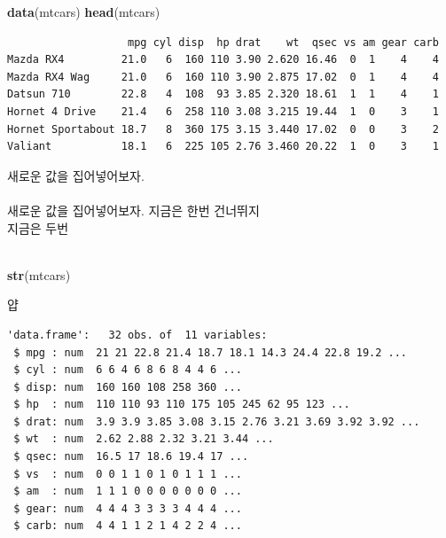 \documentclass[]{article}
\newenvironment{Shaded}{\begin{snugshade}}{\end{snugshade}}
\newcommand{\KeywordTok}[1]{\textcolor[rgb]{0.13,0.29,0.53}{\textbf{#1}}}
\newcommand{\StringTok}[1]{\textcolor[rgb]{0.31,0.60,0.02}{#1}}
\newcommand{\OperatorTok}[1]{\textcolor[rgb]{0.81,0.36,0.00}{\textbf{#1}}}
\newcommand{\NormalTok}[1]{#1}
\begin{document}
\begin{Shaded}
\begin{Highlighting}[]
\KeywordTok{data}\NormalTok{(mtcars)}
\KeywordTok{head}\NormalTok{(mtcars)}
\end{Highlighting}
\end{Shaded}

\begin{verbatim}
                   mpg cyl disp  hp drat    wt  qsec vs am gear carb
Mazda RX4         21.0   6  160 110 3.90 2.620 16.46  0  1    4    4
Mazda RX4 Wag     21.0   6  160 110 3.90 2.875 17.02  0  1    4    4
Datsun 710        22.8   4  108  93 3.85 2.320 18.61  1  1    4    1
Hornet 4 Drive    21.4   6  258 110 3.08 3.215 19.44  1  0    3    1
Hornet Sportabout 18.7   8  360 175 3.15 3.440 17.02  0  0    3    2
Valiant           18.1   6  225 105 2.76 3.460 20.22  1  0    3    1
\end{verbatim}
새로운 값을 집어넣어보자. \\\\
새로운 값을 집어넣어보자. 지금은 한번 건너뛰지\\
지금은 두번\\\\


\begin{Shaded}
\begin{Highlighting}[]
\KeywordTok{str}\NormalTok{(mtcars)}
\end{Highlighting}
\end{Shaded}
얍
\begin{verbatim}
'data.frame':   32 obs. of  11 variables:
 $ mpg : num  21 21 22.8 21.4 18.7 18.1 14.3 24.4 22.8 19.2 ...
 $ cyl : num  6 6 4 6 8 6 8 4 4 6 ...
 $ disp: num  160 160 108 258 360 ...
 $ hp  : num  110 110 93 110 175 105 245 62 95 123 ...
 $ drat: num  3.9 3.9 3.85 3.08 3.15 2.76 3.21 3.69 3.92 3.92 ...
 $ wt  : num  2.62 2.88 2.32 3.21 3.44 ...
 $ qsec: num  16.5 17 18.6 19.4 17 ...
 $ vs  : num  0 0 1 1 0 1 0 1 1 1 ...
 $ am  : num  1 1 1 0 0 0 0 0 0 0 ...
 $ gear: num  4 4 4 3 3 3 3 4 4 4 ...
 $ carb: num  4 4 1 1 2 1 4 2 2 4 ...
\end{verbatim}

\newpage

\begin{Shaded}
\end{Shaded}
\end{document}
